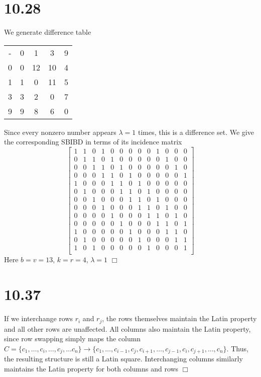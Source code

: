 \documentclass{article}
\begin{document}
\section*{10.28}
We generate difference table
\begin{center}
\begin{tabular}{c||c|c|c|c}
- & 0 & 1 & 3 & 9\\
\hhline{=||=|=|=|=}
0 & 0 & 12 & 10 & 4\\
\hline
1 & 1 & 0 & 11 & 5\\
\hline
3 & 3 & 2 & 0 & 7\\
\hline
9 & 9 & 8 & 6 & 0
\end{tabular}
\end{center}
Since every nonzero number appears $\lambda = 1$ times, this is a difference set. We give the corresponding SBIBD in terms of its incidence matrix
\setcounter{MaxMatrixCols}{20}
$$\begin{bmatrix}
1 & 1 & 0 & 1 & 0 & 0 & 0 & 0 & 0 & 1 & 0 & 0 & 0 \\
0 & 1 & 1 & 0 & 1 & 0 & 0 & 0 & 0 & 0 & 1 & 0 & 0 \\
0 & 0 & 1 & 1 & 0 & 1 & 0 & 0 & 0 & 0 & 0 & 1 & 0 \\
0 & 0 & 0 & 1 & 1 & 0 & 1 & 0 & 0 & 0 & 0 & 0 & 1 \\
1 & 0 & 0 & 0 & 1 & 1 & 0 & 1 & 0 & 0 & 0 & 0 & 0 \\
0 & 1 & 0 & 0 & 0 & 1 & 1 & 0 & 1 & 0 & 0 & 0 & 0 \\
0 & 0 & 1 & 0 & 0 & 0 & 1 & 1 & 0 & 1 & 0 & 0 & 0 \\
0 & 0 & 0 & 1 & 0 & 0 & 0 & 1 & 1 & 0 & 1 & 0 & 0 \\
0 & 0 & 0 & 0 & 1 & 0 & 0 & 0 & 1 & 1 & 0 & 1 & 0 \\
0 & 0 & 0 & 0 & 0 & 1 & 0 & 0 & 0 & 1 & 1 & 0 & 1 \\
1 & 0 & 0 & 0 & 0 & 0 & 1 & 0 & 0 & 0 & 1 & 1 & 0 \\
0 & 1 & 0 & 0 & 0 & 0 & 0 & 1 & 0 & 0 & 0 & 1 & 1 \\
1 & 0 & 1 & 0 & 0 & 0 & 0 & 0 & 1 & 0 & 0 & 0 & 1 \\
\end{bmatrix}$$
Here $b = v = 13$, $k = r = 4$, $\lambda = 1$ $\Box$

\section*{10.37}
If we interchange rows $r_i$ and $r_j$, the rows themselves maintain the Latin property and all other rows are unaffected. All columns also maintain the Latin property, since row swapping simply maps the column $C = \{c_1, \dots, c_i, \dots, c_j, \dots c_n\} \to \{c_1, \dots, c_{i-1}, c_{j}, c_{i+1}, \dots, c_{j-1}, c_i, c_{j+1}, \dots, c_n\}$. Thus, the resulting structure is still a Latin square. Interchanging columns similarly maintains the Latin property for both columns and rows $\Box$
\end{document}
